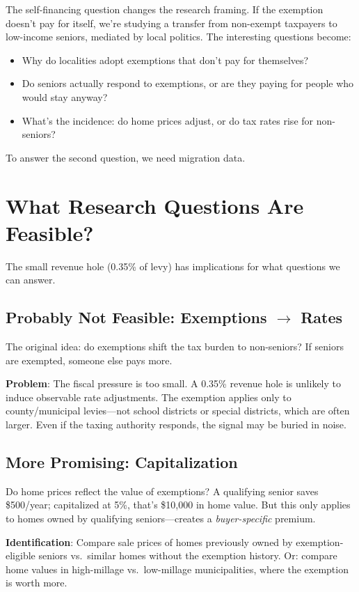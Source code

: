 \documentclass[11pt]{article}
\begin{document}
The self-financing question changes the research framing. If the exemption doesn't pay for itself, we're studying a transfer from non-exempt taxpayers to low-income seniors, mediated by local politics. The interesting questions become:
\begin{itemize}
    \item Why do localities adopt exemptions that don't pay for themselves?
    \item Do seniors actually respond to exemptions, or are they paying for people who would stay anyway?
    \item What's the incidence: do home prices adjust, or do tax rates rise for non-seniors?
\end{itemize}

To answer the second question, we need migration data.

\section{What Research Questions Are Feasible?}

The small revenue hole (0.35\% of levy) has implications for what questions we can answer.

\subsection{Probably Not Feasible: Exemptions $\to$ Rates}

The original idea: do exemptions shift the tax burden to non-seniors? If seniors are exempted, someone else pays more.

\textbf{Problem}: The fiscal pressure is too small. A 0.35\% revenue hole is unlikely to induce observable rate adjustments. The exemption applies only to county/municipal levies---not school districts or special districts, which are often larger. Even if the taxing authority responds, the signal may be buried in noise.

\subsection{More Promising: Capitalization}

Do home prices reflect the value of exemptions? A qualifying senior saves \$500/year; capitalized at 5\%, that's \$10,000 in home value. But this only applies to homes owned by qualifying seniors---creates a \textit{buyer-specific} premium.

\textbf{Identification}: Compare sale prices of homes previously owned by exemption-eligible seniors vs.\ similar homes without the exemption history. Or: compare home values in high-millage vs.\ low-millage municipalities, where the exemption is worth more.
\end{document}
